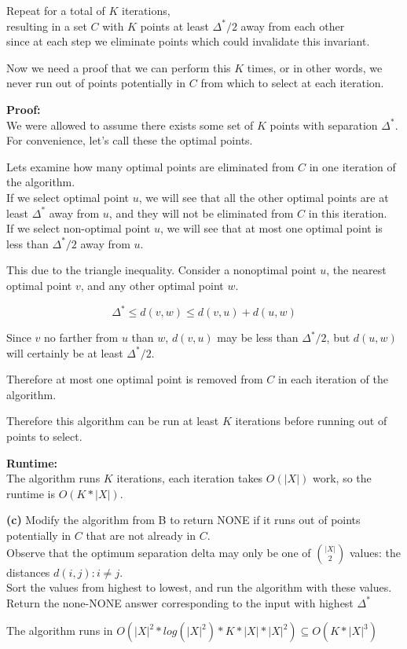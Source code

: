 \documentclass[11pt]{article}
\renewcommand{\part}[1] {\vspace{.10in} {\bf (#1)}}
\begin{document}
Repeat for a total of $K$ iterations,\\
resulting in a set $C$ with $K$ points at least $\Delta^{*} / 2$ away from each other\\
since at each step we eliminate points which could invalidate this invariant.

Now we need a proof that we can perform this $K$ times, or in other words, we never run out of points potentially in $C$ from which to select at each iteration.

\textbf{Proof:}\\
We were allowed to assume there exists some set of $K$ points with separation $\Delta^{*}$.\\
For convenience, let's call these the optimal points.

Lets examine how many optimal points are eliminated from $C$ in one iteration of the algorithm.\\
If we select optimal point $u$, we will see that all the other optimal points are at least $\Delta^{*}$ away from $u$, and they will not be eliminated from $C$ in this iteration.\\
If we select non-optimal point $u$, we will see that at most one optimal point is less than $\Delta^{*} / 2$ away from $u$.

This due to the triangle inequality. Consider a nonoptimal point $u$, the nearest optimal point $v$, and any other optimal point $w$.

$$\Delta^{*} \leq d(v,w) \leq d(v,u) + d(u,w)$$

Since $v$ no farther from  $u$ than $w$, $d(v,u)$ may be less than $\Delta^{*} / 2$, but $d(u,w)$ will certainly be at least $\Delta^{*} / 2$.

Therefore at most one optimal point is removed from $C$ in each iteration of the algorithm.

Therefore this algorithm can be run at least $K$ iterations before running out of points to select.

\textbf{Runtime:}\\
The algorithm runs $K$ iterations, each iteration takes $O(|X|)$ work, so the runtime is $O(K*|X|)$.

\part{c}
Modify the algorithm from B to return NONE if it runs out of points potentially in $C$ that are not already in $C$.\\
Observe that the optimum separation delta may only be one of $\binom{|X|}{2}$ values: the distances $d(i,j) : i \neq j$.\\
Sort the values from highest to lowest, and run the algorithm with these values.\\
Return the none-NONE answer corresponding to the input with highest $\Delta^{*}$

The algorithm runs in $O(|X|^{2} * log(|X|^2) * K*|X|*|X|^2) \subseteq O(K*|X|^3)$
\end{document}
